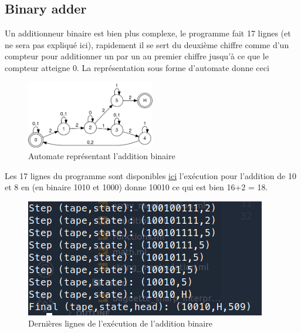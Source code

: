 \documentclass[11pt,colorlinks=true,a4paper]{article}
\begin{document}
    \subsection{Binary adder}
    Un additionneur binaire est bien plus complexe, le programme fait 17 lignes (et ne sera pas expliqué ici), rapidement 
    il se sert du deuxième chiffre comme d'un compteur pour additionner un par un au premier chiffre jusqu'à ce que le compteur atteigne 0.
    La représentation sous forme d'automate donne ceci
    \begin{figure}[H]
        \center 
        \includegraphics[width=0.5\textwidth]{img/automata2.png}
        \caption{Automate représentant l'addition binaire}
    \end{figure}
    Les 17 lignes du programme sont disponibles \href{https://github.com/coco33920/ocaml-baguettesharp-interpreter/blob/master/examples/turing_programs.txt#L5}{ici}
    l'exécution pour l'addition de 10 et 8 en (en binaire 1010 et 1000) donne 10010 ce qui est bien 16+2 = 18.
    \begin{figure}[H]
        \center 
        \includegraphics[]{img/adder.png}
        \caption{Dernières lignes de l'exécution de l'addition binaire}
    \end{figure}
\end{document}
